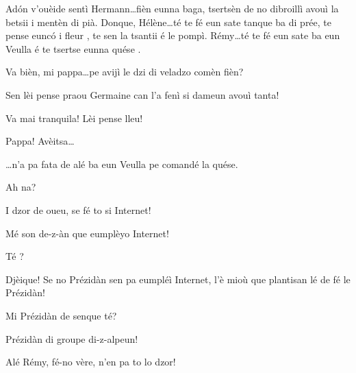 \begin{drama}

\Cesarspeaks{} Ad\'on v'ouèide sentì Hermann\ldots fièn eunna baga, tser\-tsèn de no dibroillì avouì la betsii i mentèn di pià. Donque, Hélène\ldots té te fé eun sate tanque ba di prée, te pense eunc\'o i fleur \fiori, te sen la tsantii é le pompì. Rémy\ldots té te fé eun sate ba eun Veulla é te tsertse eunna quése \cassa.


\Helenespeaks Va bièn, mi pappa\ldots pe avijì le dzi di veladzo comèn fièn?

\Cesarspeaks   Sen lèi pense praou Germaine  can l'a fenì si dameun avouì tanta!

\Battistaspeaks{} Va mai tranquila! Lèi pense lleu!

\newpage
{}


\Remyspeaks  Pappa! Avèitsa\ldots


\Remyspeaks \ldots n’a pa fata de alé ba 
eun Veulla pe comandé la quése.

\Cesarspeaks Ah na?

\Remyspeaks I dzor de oueu, se fé to si Internet! 

\Battistaspeaks{}  Mé son de-z-àn que eumplèyo Internet!

\Cesarspeaks{} Té \contraria ?

\Battistaspeaks Djèique! Se no Prézidàn sen pa eumpléì Internet, l’è mioù que plantisan lé de fé le Prézidàn!

\Hermannspeaks Mi Prézidàn de senque té?

\Battistaspeaks  Prézidàn di groupe di-z-alpeun!


\Cesarspeaks Alé Rémy, fé-no vère, n'en pa to lo dzor! 



\end{drama}
